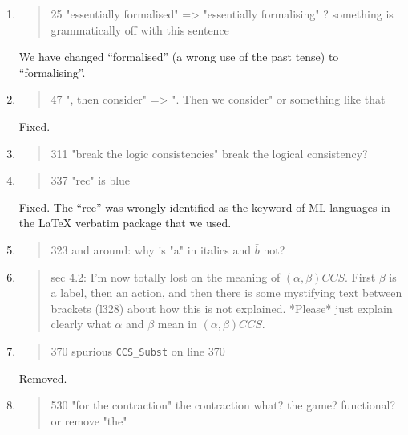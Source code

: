 \begin{enumerate}
  \item \begin{quote}
25 "essentially formalised" => "essentially formalising" ? something is grammatically off with this sentence
\end{quote}
  \Mark We have changed ``formalised'' (a wrong use of the past tense) to ``formalising''. 

  \item \begin{quote}
47 ", then consider" => ". Then we consider" or something like that
\end{quote}
  \Mark Fixed.

  \item \begin{quote}
311 "break the logic consistencies" break the logical consistency?
\end{quote}
  \Mark

  \item \begin{quote}
337 "rec" is blue
\end{quote}
  \Mark Fixed. The ``rec'' was wrongly identified as the keyword of ML
  languages in the \LaTeX{} verbatim package that we used.

  \item \begin{quote}
323 and around: why is "a" in italics and $\bar{b}$ not?
\end{quote}
  \Mark

  \item \begin{quote}
sec 4.2: I'm now totally lost on the meaning of $(\alpha, \beta) CCS$. First $\beta$ is a label, then an action, and then there is some mystifying text between brackets (l328) about how this is not explained. *Please* just explain clearly what $\alpha$ and $\beta$ mean in $(\alpha, \beta) CCS$. 
\end{quote}
  \Mark

  \item \begin{quote}
370 spurious \texttt{CCS_Subst} on line 370
\end{quote}
  \Mark Removed.

  \item \begin{quote}
530 "for the contraction" the contraction what? the game? functional? or remove "the"
\end{quote}
  \Mark


\end{enumerate}
